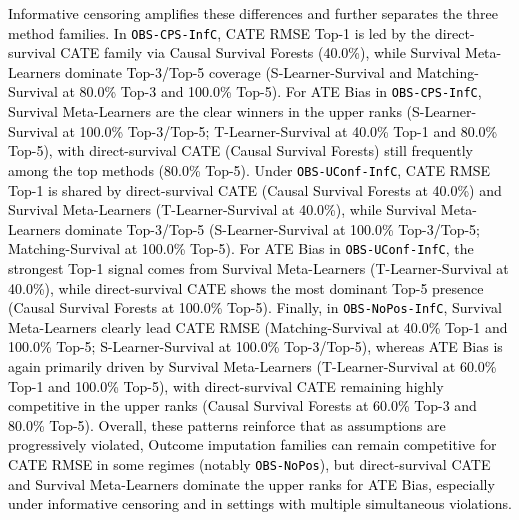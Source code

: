 \documentclass{article} %
\newcommand{\rebuttal}[1]{\textcolor{black}{#1}}
\begin{document}
\rebuttal{Informative censoring amplifies these differences and further separates the three method families. In \texttt{OBS-CPS-InfC}, CATE RMSE Top-1 is led by the direct-survival CATE family via Causal Survival Forests (40.0\%), while Survival Meta-Learners dominate Top-3/Top-5 coverage (S-Learner-Survival and Matching-Survival at 80.0\% Top-3 and 100.0\% Top-5). For ATE Bias in \texttt{OBS-CPS-InfC}, Survival Meta-Learners are the clear winners in the upper ranks (S-Learner-Survival at 100.0\% Top-3/Top-5; T-Learner-Survival at 40.0\% Top-1 and 80.0\% Top-5), with direct-survival CATE (Causal Survival Forests) still frequently among the top methods (80.0\% Top-5). Under \texttt{OBS-UConf-InfC}, CATE RMSE Top-1 is shared by direct-survival CATE (Causal Survival Forests at 40.0\%) and Survival Meta-Learners (T-Learner-Survival at 40.0\%), while Survival Meta-Learners dominate Top-3/Top-5 (S-Learner-Survival at 100.0\% Top-3/Top-5; Matching-Survival at 100.0\% Top-5). For ATE Bias in \texttt{OBS-UConf-InfC}, the strongest Top-1 signal comes from Survival Meta-Learners (T-Learner-Survival at 40.0\%), while direct-survival CATE shows the most dominant Top-5 presence (Causal Survival Forests at 100.0\% Top-5). Finally, in \texttt{OBS-NoPos-InfC}, Survival Meta-Learners clearly lead CATE RMSE (Matching-Survival at 40.0\% Top-1 and 100.0\% Top-5; S-Learner-Survival at 100.0\% Top-3/Top-5), whereas ATE Bias is again primarily driven by Survival Meta-Learners (T-Learner-Survival at 60.0\% Top-1 and 100.0\% Top-5), with direct-survival CATE remaining highly competitive in the upper ranks (Causal Survival Forests at 60.0\% Top-3 and 80.0\% Top-5). Overall, these patterns reinforce that as assumptions are progressively violated, Outcome imputation families can remain competitive for CATE RMSE in some regimes (notably \texttt{OBS-NoPos}), but direct-survival CATE and Survival Meta-Learners dominate the upper ranks for ATE Bias, especially under informative censoring and in settings with multiple simultaneous violations.}
\end{document}
